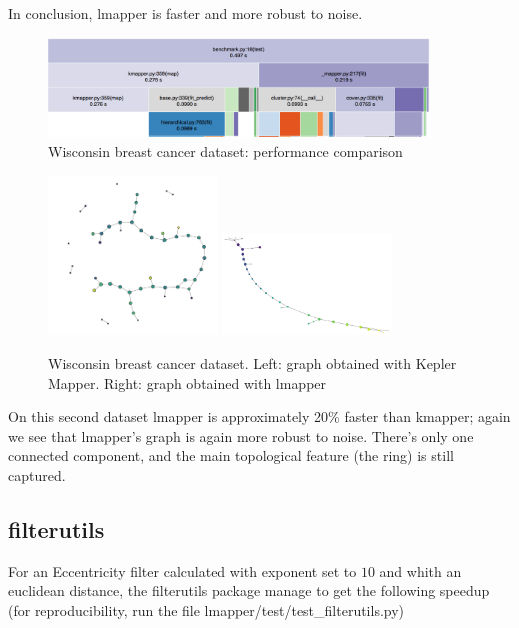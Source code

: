 In conclusion, lmapper is faster and more robust to noise.

\begin{figure}[h]
	\caption{Wisconsin breast cancer dataset: performance comparison}
	\centering
	\includegraphics[width=0.9\textwidth]{images/benchmark/cat/benchmark}
\end{figure}
\begin{figure}[h!]
	\caption{Wisconsin breast cancer dataset. Left: graph obtained with Kepler Mapper. Right: graph obtained with lmapper}
	\centering
	\includegraphics[width=0.4\textwidth]{images/benchmark/cat/benchmark_kmapper}	\includegraphics[width=0.4\textwidth]{images/benchmark/cat/benchmark_lmapper}
\end{figure}

On this second dataset lmapper is approximately 20\% faster than kmapper; again we see that lmapper's graph is again more robust to noise. There's only one connected component, and the main topological feature (the ring) is still captured.

\subsection{filterutils}
For an Eccentricity filter calculated with exponent set to $10$ and whith an euclidean distance, the filterutils package manage to get the following speedup (for reproducibility, run the file lmapper/test/test\_filterutils.py)

